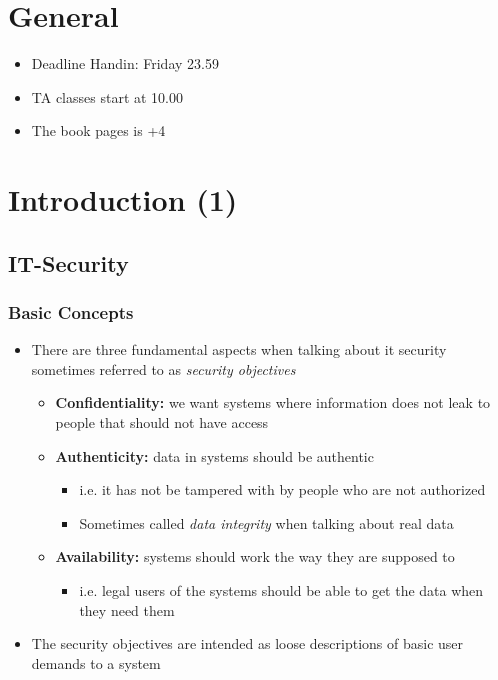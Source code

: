 \documentclass[11pt]{article}
\author{Martin Nørskov Jensen}
\date{\today}
\title{}
\begin{document}
\tableofcontents

\section{General}
\label{sec:org749e8b0}
\begin{itemize}
\item Deadline Handin: Friday 23.59
\item TA classes start at 10.00
\item The book pages is +4
\end{itemize}

\section{Introduction (1)}
\label{sec:org9ec35d6}
\subsection{IT-Security}
\label{sec:org1233000}
\subsubsection{Basic Concepts}
\label{sec:org77792f3}
\begin{itemize}
\item There are three fundamental aspects when talking about it security sometimes referred to as \emph{security objectives}
\begin{itemize}
\item \textbf{Confidentiality:} we want systems where information does not leak to people that should not have access
\item \textbf{Authenticity:} data in systems should be authentic
\begin{itemize}
\item i.e. it has not be tampered with by people who are not authorized
\item Sometimes called \emph{data integrity} when talking about real data
\end{itemize}
\item \textbf{Availability:} systems should work the way they are supposed to
\begin{itemize}
\item i.e. legal users of the systems should be able to get the data when they need them
\end{itemize}
\end{itemize}

\item The security objectives are intended as loose descriptions of basic user demands to a system
\end{itemize}
\end{document}
